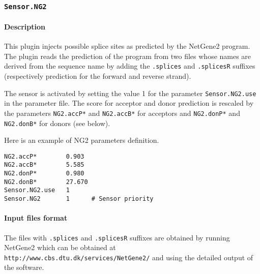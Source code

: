 
\subsubsection{\texttt{Sensor.NG2}}

\paragraph{Description}

This plugin injects possible splice sites as predicted by the
NetGene2 program. The plugin reads the prediction of the
program from two files whose names are derived from the sequence name
by adding the \texttt{.splices} and \texttt{.splicesR} suffixes
(respectively prediction for the forward and reverse strand).

The sensor is activated by setting the value 1 for the parameter
\texttt{Sensor.NG2.use} in the parameter file. The score for acceptor
and donor prediction is rescaled by the parameters {\tt NG2.accP*} and
{\tt NG2.accB*} for acceptors and {\tt NG2.donP*} and {\tt NG2.donB*} for
donors (see below).

Here is an example of NG2 parameters definition.
\begin{Verbatim}[fontsize=\small]
NG2.accP*        0.903
NG2.accB*        5.585
NG2.donP*        0.980
NG2.donB*        27.670
Sensor.NG2.use   1
Sensor.NG2       1      # Sensor priority
\end{Verbatim}

\paragraph{Input files format}

The files with \texttt{.splices} and \texttt{.splicesR} suffixes are
obtained by running NetGene2 which can be obtained at
\texttt{http://www.cbs.dtu.dk/services/NetGene2/} and using the
detailed output of the software.

